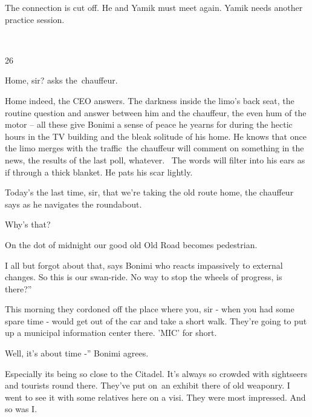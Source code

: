 \documentclass[letterpaper]{article}
\begin{document}
The connection is cut off. He and Yamik must meet again. Yamik needs another practice session. 

~

26 

{\textquotedbl}Home, sir?{\textquotedbl} asks the~chauffeur. 

{\textquotedbl}Home indeed,{\textquotedbl} the CEO answers. The darkness inside\textcolor{red}{ }the limo's back seat,
the routine question and answer between him and the chauffeur, the even hum of the motor -- all these give Bonimi a
sense of peace he yearns for during the hectic hours in the TV building and the\textcolor{red}{ }bleak solitude of his
home. He knows that once the limo merges with the traffic~the chauffeur will comment on something in the news, the
results of the last poll, whatever. \ The words will filter into his ears as if through a thick blanket. He pats his
scar lightly.

{\textquotedbl}Today's the last time, sir, that we're taking the old route home,{\textquotedbl} the chauffeur says as he
navigates the roundabout. 

{\textquotedbl}Why's that?{\textquotedbl} 

{\textquotedbl}On the dot of midnight our good old Old Road becomes pedestrian.{\textquotedbl} 

{\textquotedbl}I all but forgot about that,{\textquotedbl} says Bonimi who reacts impassively to external changes.
{\textquotedbl}So this is our swan-ride. No way to stop the wheels of progress, is there?'' 

{\textquotedbl}This morning they cordoned off the place where you, sir - when you had some spare time - would get out of
the car and take a short walk. They're going to put up a municipal information center there. 'MIC' for
short.{\textquotedbl} 

{\textquotedbl}Well, it's about time -'' Bonimi agrees. \textcolor{red}{\ }

{\textquotedbl}Especially its being so close to the Citadel. It's always so crowded with sightseers and tourists round
there. They've put on~an exhibit there of old weaponry. I went to see it with some relatives here on a visi. They were
most impressed. And so was I.{\textquotedbl}
\end{document}
